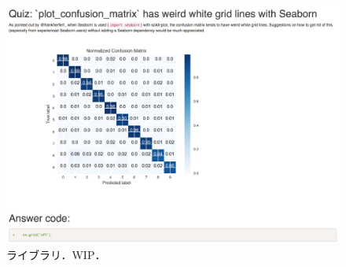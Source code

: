 \begin{figure}[t]
	\centering
  \includegraphics[width=1.0\columnwidth]{20190107-lab-study-lib-exercise.png}
  \caption{ライブラリ．WIP．}
  \label{fig:lab-study-eg-lib}
\end{figure}




